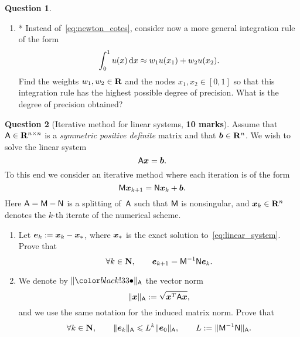 \documentclass[11pt]{article}
\theoremstyle{definition}
\newtheorem{question}{Question}
\theoremstyle{remark}
\theoremstyle{plain}%
\begin{document}
\begin{question}
\begin{enumerate}
        \item
        *
        Instead of~\eqref{eq:newton_cotes},
        consider now a more general integration rule of the form
        \begin{equation}
            \label{eq:gauss_legendre}
            \int_{0}^{1} u(x) \, \mathrm d x \approx w_1 u(x_1) + w_2 u(x_2).
        \end{equation}
        Find the weights $w_1, w_2 \in \mathbf R$ and the nodes $x_1, x_2 \in [0, 1]$ so that this integration rule has the highest possible degree of precision.
        What is the degree of precision obtained?

    \end{enumerate}
\end{question}

\newpage
\begin{question}
    [Iterative method for linear systems, \textbf{10 marks}]
    Assume that $\mathsf A \in \mathbf R^{n \times n}$ is a \emph{symmetric positive definite} matrix and that $\mathbf{\boldsymbol{b}} \in \mathbf R^n$.
    We wish to solve the linear system
    \begin{equation}
        \label{eq:linear_system}
        \mathsf A \mathbf{\boldsymbol{x}} = \mathbf{\boldsymbol{b}}.
    \end{equation}
    To this end we consider an iterative method where each iteration is of the form
    \begin{equation}
        \label{eq:iterative_scheme}
        \mathsf M \mathbf{\boldsymbol{x}}_{k+1} = \mathsf N \mathbf{\boldsymbol{x}}_k + \mathbf{\boldsymbol{b}}.
    \end{equation}
    Here $\mathsf A = \mathsf M - \mathsf N$ is a splitting of~$\mathsf A$ such that $\mathsf M$ is nonsingular,
    and $\mathbf{\boldsymbol{x}}_k \in \mathbf R^n$ denotes the $k$-th iterate of the numerical scheme.

    \begin{enumerate}
        \item
            Let $\mathbf{\boldsymbol{e}}_k := \mathbf{\boldsymbol{x}}_k - \mathbf{\boldsymbol{x}}_*$,
            where $\mathbf{\boldsymbol{x}}_*$ is the exact solution to~\eqref{eq:linear_system}.
            Prove that
            \[
                \forall k \in \mathbf N, \qquad
                \mathbf{\boldsymbol{e}}_{k+1} = \mathsf M^{-1} \mathsf N \mathbf{\boldsymbol{e}}_k.
            \]

        \item
            We denote by $\norm{\placeholder}_{\mat A}$ the vector norm
            \begin{equation}
                \lVert\mathbf{\boldsymbol{x}}\rVert_{\mathsf A} := \sqrt{\mathbf{\boldsymbol{x}}^T \mathsf A \mathbf{\boldsymbol{x}}},
            \end{equation}
            and we use the same notation for the induced matrix norm.
            Prove that
            \begin{equation}
                \label{eq:inequality_interpolation}
                \forall k \in \mathbf N, \qquad
                \lVert\mathbf{\boldsymbol{e}}_k\rVert_{\mathsf A} \leqslant L^k \lVert\mathbf{\boldsymbol{e}}_0\rVert_{\mathsf A},
                \qquad L := \lVert\mathsf M^{-1} \mathsf N\rVert_{\mathsf A}.
            \end{equation}


\end{enumerate}
\end{question}
\end{document}
